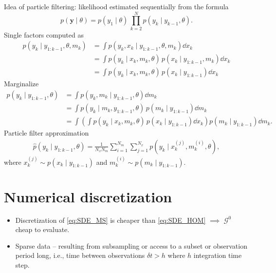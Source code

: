 \documentclass[10pt]{article}
\begin{document}
Idea of particle filtering: likelihood estimated sequentially from the formula
\begin{equation}
p(\mathbf y \mid \theta) = p(y_1 \mid \theta) \, \prod_{k=2}^{N} p(y_k \mid y_{k-1}, \theta). 
\end{equation}
Single factors computed as
\begin{equation}
\begin{aligned}
p(y_k \mid y_{1:k-1}, \theta, m_k) &= \int p(y_k, x_k \mid y_{1:k-1}, \theta, m_k) \dd x_k\\
&= \int p(y_k \mid x_k, m_k, \theta) \, p(x_k \mid y_{1:k-1},m_k) \dd x_k \\
&= \int p(y_k \mid x_k, m_k, \theta) \, p(x_k \mid y_{1:k-1}) \dd x_k
\end{aligned}
\end{equation}
Marginalize
\begin{equation}
\begin{aligned}
p(y_k \mid y_{1:k-1}, \theta) &= \int p(y_k, m_k \mid y_{1:k-1}, \theta) \dd m_k \\
&= \int p(y_k \mid m_k, y_{1:k-1}, \theta) \, p(m_k \mid y_{1:k-1}) \dd m_k \\
&= \int \left(\int p(y_k \mid x_k, m_k, \theta) \, p(x_k \mid y_{1:k-1}) \dd x_k \right) p(m_k \mid y_{1:k-1}) \dd m_k.
\end{aligned}
\end{equation}
Particle filter approximation
\begin{equation}
\begin{aligned}
\widehat p(y_k \mid y_{1:k-1}, \theta) = \frac{1}{N_x N_m} \sum_{i=1}^{N_m} \sum_{j=1}^{N_x} p(y_k \mid x_k^{(j)}, m_k^{(i)}, \theta),
\end{aligned}
\end{equation}
where $x_k^{(j)} \sim p(x_k \mid y_{1:k-1})$ and $m_k^{(i)} \sim p(m_k \mid y_{1:k-1})$.

\section{Numerical discretization}

\begin{itemize}[label=-]
	\item Discretization of \eqref{eq:SDE_MS} is cheaper than \eqref{eq:SDE_HOM} $\implies$ $\mathcal G^0$ cheap to evaluate.
	\item Sparse data -- resulting from subsampling or access to a subset or observation period long, i.e., time between observations $\delta t > h$ where $h$ integration time step.
\end{itemize}
\end{document}
